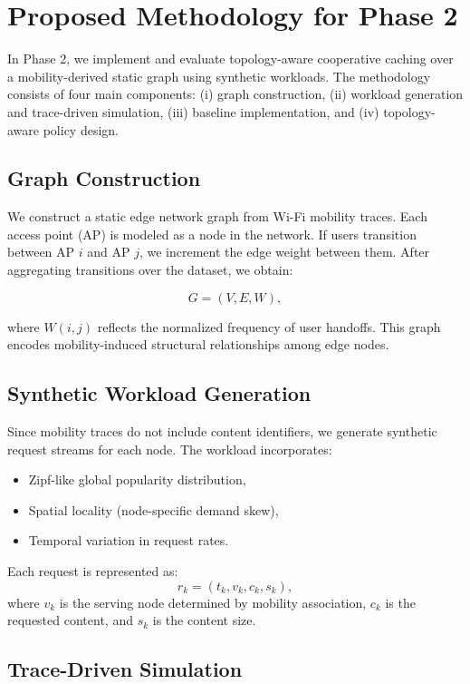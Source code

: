 \section{Proposed Methodology for Phase 2}

In Phase 2, we implement and evaluate topology-aware cooperative caching over a mobility-derived static graph using synthetic workloads. The methodology consists of four main components: (i) graph construction, (ii) workload generation and trace-driven simulation, (iii) baseline implementation, and (iv) topology-aware policy design.

\subsection{Graph Construction}

We construct a static edge network graph from Wi-Fi mobility traces. Each access point (AP) is modeled as a node in the network. If users transition between AP $i$ and AP $j$, we increment the edge weight between them. After aggregating transitions over the dataset, we obtain:

\[
G = (V, E, W),
\]

where $W(i,j)$ reflects the normalized frequency of user handoffs. This graph encodes mobility-induced structural relationships among edge nodes.

\subsection{Synthetic Workload Generation}

Since mobility traces do not include content identifiers, we generate synthetic request streams for each node. The workload incorporates:

\begin{itemize}
    \item Zipf-like global popularity distribution,
    \item Spatial locality (node-specific demand skew),
    \item Temporal variation in request rates.
\end{itemize}

Each request is represented as:
\[
r_k = (t_k, v_k, c_k, s_k),
\]
where $v_k$ is the serving node determined by mobility association, $c_k$ is the requested content, and $s_k$ is the content size.

\subsection{Trace-Driven Simulation}

